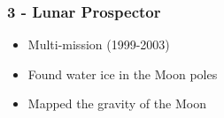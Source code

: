 \documentclass[aspectratio=169]{beamer}
\begin{document}

\begin{frame}
  \frametitle{3 - Lunar Prospector}
\begin{center}
\begin{itemize}
 \item Multi-mission (1999-2003) 
 \item Found water ice in the Moon poles
 \item Mapped the gravity of the Moon
\end{itemize}
\end{center}
\end{frame}


{
\begin{frame}[plain]
\end{frame}}


{
\begin{frame}[plain]
\end{frame}}
\end{document}
